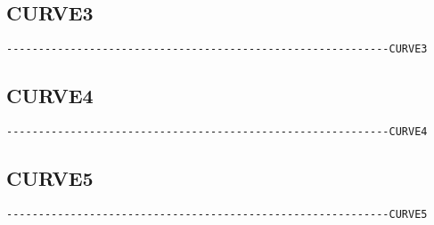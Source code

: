 \subsection{CURVE3}
\begin{verbatim}
------------------------------------------------------------CURVE3
\end{verbatim}


\subsection{CURVE4}
\begin{verbatim}
------------------------------------------------------------CURVE4
\end{verbatim}


\subsection{CURVE5}
\begin{verbatim}
------------------------------------------------------------CURVE5
\end{verbatim}

